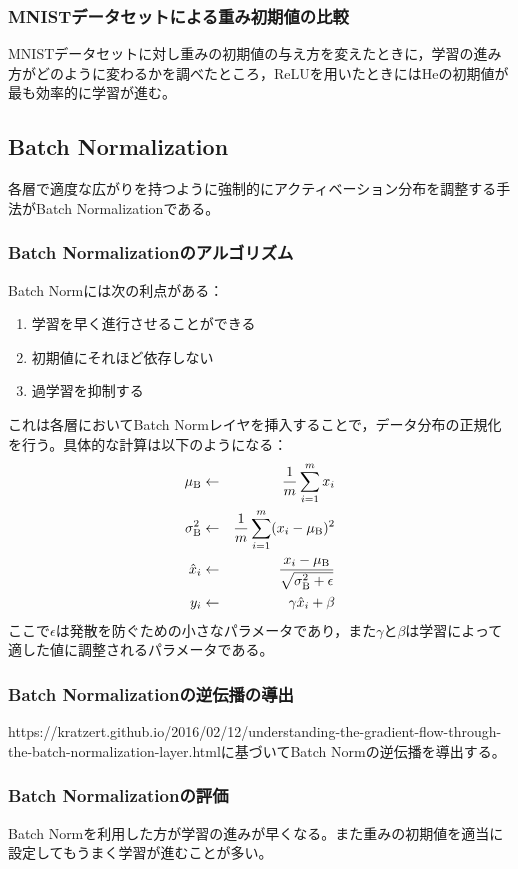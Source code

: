 \documentclass{jarticle}
\begin{document}
\subsubsection{MNISTデータセットによる重み初期値の比較}
MNISTデータセットに対し重みの初期値の与え方を変えたときに，学習の進み方がどのように変わるかを調べたところ，ReLUを用いたときにはHeの初期値が最も効率的に学習が進む。

\subsection{Batch Normalization}
各層で適度な広がりを持つように強制的にアクティベーション分布を調整する手法がBatch Normalizationである。
\subsubsection{Batch Normalizationのアルゴリズム}
Batch Normには次の利点がある：
\begin{enumerate}
\item 学習を早く進行させることができる
\item 初期値にそれほど依存しない
\item 過学習を抑制する
\end{enumerate}
これは各層においてBatch Normレイヤを挿入することで，データ分布の正規化を行う。具体的な計算は以下のようになる：
\begin{eqnarray*}
\mu_{\rm B} &\leftarrow& \dfrac{1}{m} \sum_{i = 1}^{m} x_i\\
\sigma_{\rm B}^2 &\leftarrow& \dfrac{1}{m} \sum_{i=1}^{m} (x_i - \mu_{\rm B})^2\\
\hat{x}_i &\leftarrow& \dfrac{x_i - \mu_{\rm B}}{\sqrt{\sigma_{\rm B}^2+\epsilon}}\\
y_i &\leftarrow& \gamma \hat{x}_i + \beta
\end{eqnarray*}
ここで$\epsilon$は発散を防ぐための小さなパラメータであり，また$\gamma$と$\beta$は学習によって適した値に調整されるパラメータである。

\subsubsection{Batch Normalizationの逆伝播の導出}
https://kratzert.github.io/2016/02/12/understanding-the-gradient-flow-through-the-batch-normalization-layer.htmlに基づいてBatch Normの逆伝播を導出する。

\subsubsection{Batch Normalizationの評価}
Batch Normを利用した方が学習の進みが早くなる。また重みの初期値を適当に設定してもうまく学習が進むことが多い。
\end{document}
